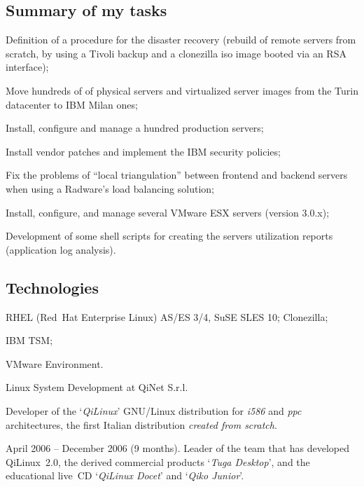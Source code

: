 \subsection{Summary of my tasks}

\item{\bdot} Definition of a procedure for the disaster recovery 
   (rebuild of remote servers from scratch, by using a Tivoli backup and a 
    clonezilla iso image booted via an RSA interface);
\item{\bdot} Move hundreds of of physical servers and virtualized server 
   images from the Turin datacenter to IBM Milan ones;
\item{\bdot} Install, configure and manage a hundred production servers;
\item{\bdot} Install vendor patches and implement the IBM security policies;
\item{\bdot} Fix the problems of ``local triangulation'' between frontend 
   and backend servers when using a Radware's load balancing solution;
\item{\bdot} Install, configure, and manage several VMware ESX servers 
   (version 3.0.x);
\item{\bdot} Development of some shell scripts for creating the servers 
   utilization reports (application log analysis).

\subsection{Technologies}

\item{\bdot} RHEL (Red~Hat Enterprise Linux) AS/ES 3/4, SuSE SLES 10; Clonezilla;
\item{\bdot} IBM TSM;
\item{\bdot} VMware Environment.
 

   {Linux System Development at QiNet S.r.l.}

Developer of the `{\it QiLinux\/}' GNU/Linux distribution for {\it i586} and
{\it ppc} architectures, the first Italian distribution
{\it created from scratch}.

April 2006 -- December 2006 (9 months). 
Leader of the team that has developed QiLinux~2.0, the derived commercial 
products `{\it Tuga Desktop\/}', and the educational live~CD 
`{\it QiLinux Docet\/}' and `{\it Qiko Junior\/}'.

